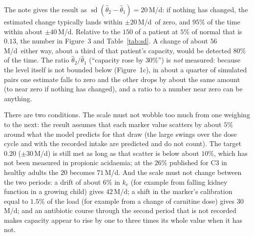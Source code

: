 \documentclass[11pt,a4paper]{article}
\newcommand{\um}{\,\textmu M/d}
\begin{document}
The note gives the result as $\operatorname{sd}(\hat\theta_2-\hat\theta_1)=20$\um: if nothing has
changed, the estimated change typically lands within $\pm20$\um\ of zero, and $95\%$ of the time
within about $\pm40$\um. Relative to the $150$ of a patient at $5\%$ of normal that is $0.13$, the
number in Figure~3 and Table~\ref{tab:sd}. A change of about $56$\um\ either way, about a third of
that patient's capacity, would be detected $80\%$ of the time. The ratio
$\hat\theta_2/\hat\theta_1$ (``capacity rose by $30\%$'') is \emph{not} measured: because the level
itself is not bounded below (Figure~1c), in about a quarter of simulated pairs one estimate falls
to zero and the other drops by about the same amount (to near zero if nothing has changed), and a
ratio to a number near zero can be anything.

There are two conditions. The scale must not wobble too much from one weighing to the next: the
result assumes that each marker value scatters by about $5\%$ around what the model predicts for
that draw (the large swings over the dose cycle and with the recorded intake are predicted and do
not count). The target $0.20$ ($\pm30$\um) is still met as long as that scatter is below about
$10\%$, which has not been measured in propionic acidaemia; at the $26\%$ published for C3 in
healthy adults the $20$ becomes $71$\um. And the scale must not change between the two periods: a
drift of about $6\%$ in $k_e$ (for example from falling kidney function in a growing child) gives
$42$\um; a shift in the marker's calibration equal to $1.5\%$ of the load (for example from a
change of carnitine dose) gives $30$\um; and an antibiotic course through the second period that is
not recorded makes capacity appear to rise by one to three times its whole value when it has not.
\end{document}
